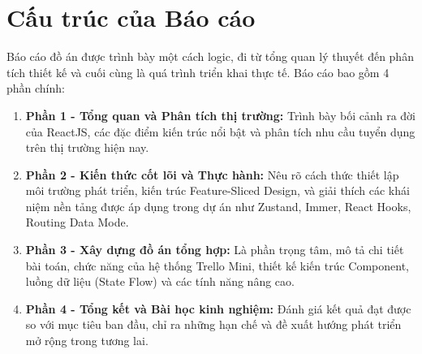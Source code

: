 \section{Cấu trúc của Báo cáo}
Báo cáo đồ án được trình bày một cách logic, đi từ tổng quan lý thuyết đến phân tích thiết kế và cuối cùng là quá trình triển khai thực tế. Báo cáo bao gồm 4 phần chính:
\begin{enumerate}
    \item \textbf{Phần 1 - Tổng quan và Phân tích thị trường:} Trình bày bối cảnh ra đời của ReactJS, các đặc điểm kiến trúc nổi bật và phân tích nhu cầu tuyển dụng trên thị trường hiện nay.
    \item \textbf{Phần 2 - Kiến thức cốt lõi và Thực hành:} Nêu rõ cách thức thiết lập môi trường phát triển, kiến trúc Feature-Sliced Design, và giải thích các khái niệm nền tảng được áp dụng trong dự án như Zustand, Immer, React Hooks, Routing Data Mode.
    \item \textbf{Phần 3 - Xây dựng đồ án tổng hợp:} Là phần trọng tâm, mô tả chi tiết bài toán, chức năng của hệ thống Trello Mini, thiết kế kiến trúc Component, luồng dữ liệu (State Flow) và các tính năng nâng cao.
    \item \textbf{Phần 4 - Tổng kết và Bài học kinh nghiệm:} Đánh giá kết quả đạt được so với mục tiêu ban đầu, chỉ ra những hạn chế và đề xuất hướng phát triển mở rộng trong tương lai.
\end{enumerate}
